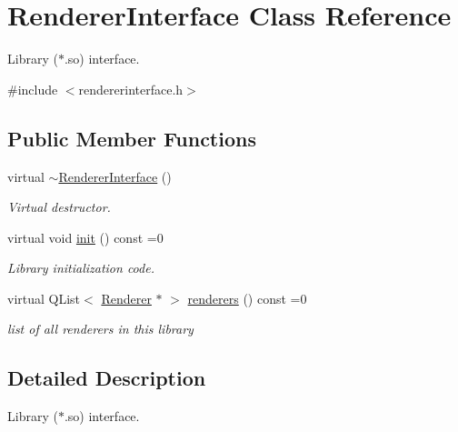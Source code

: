 \hypertarget{classRendererInterface}{
\section{\-Renderer\-Interface \-Class \-Reference}
\label{classRendererInterface}
}


\-Library ($\ast$.so) interface.  




{\ttfamily \#include $<$rendererinterface.\-h$>$}

\subsection*{\-Public \-Member \-Functions}
\begin{DoxyCompactItemize}
\item 
\hypertarget{classRendererInterface_a1dfa67d2c714f8c66759ab677569a750}{
virtual \hyperlink{classRendererInterface_a1dfa67d2c714f8c66759ab677569a750}{$\sim$\-Renderer\-Interface} ()}
\label{classRendererInterface_a1dfa67d2c714f8c66759ab677569a750}

\begin{DoxyCompactList}\small\item\em \-Virtual destructor. \end{DoxyCompactList}\item 
virtual void \hyperlink{classRendererInterface_a30013f18e503aebeef720e046e7ff8a5}{init} () const =0
\begin{DoxyCompactList}\small\item\em \-Library initialization code. \end{DoxyCompactList}\item 
\hypertarget{classRendererInterface_acbae1414227a5cece7fc6f3f514bdb20}{
virtual \-Q\-List$<$ \hyperlink{classRenderer}{\-Renderer} $\ast$ $>$ \hyperlink{classRendererInterface_acbae1414227a5cece7fc6f3f514bdb20}{renderers} () const =0}
\label{classRendererInterface_acbae1414227a5cece7fc6f3f514bdb20}

\begin{DoxyCompactList}\small\item\em list of all renderers in this library \end{DoxyCompactList}\end{DoxyCompactItemize}


\subsection{\-Detailed \-Description}
\-Library ($\ast$.so) interface. 

